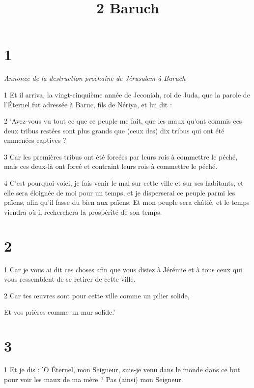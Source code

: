 

\title{2 Baruch}

\chapter{1}

\par \textit{Annonce de la destruction prochaine de Jérusalem à Baruch}

\par 1 Et il arriva, la vingt-cinquième année de Jeconiah, roi de Juda, que la parole de l'Éternel fut adressée à Baruc, fils de Nériya, et lui dit :

\par 2 'Avez-vous vu tout ce que ce peuple me fait, que les maux qu'ont commis ces deux tribus restées sont plus grands que (ceux des) dix tribus qui ont été emmenées captives ?

\par 3 Car les premières tribus ont été forcées par leurs rois à commettre le péché, mais ces deux-là ont forcé et contraint leurs rois à commettre le péché.

\par 4 C'est pourquoi voici, je fais venir le mal sur cette ville et sur ses habitants, et elle sera éloignée de moi pour un temps, et je disperserai ce peuple parmi les païens, afin qu'il fasse du bien aux païens. Et mon peuple sera châtié, et le temps viendra où il recherchera la prospérité de son temps.

\chapter{2}

\par 1 Car je vous ai dit ces choses afin que vous disiez à Jérémie et à tous ceux qui vous ressemblent de se retirer de cette ville.

\par 2 Car tes œuvres sont pour cette ville comme un pilier solide,

\par Et vos prières comme un mur solide.'

\chapter{3}

\par 1 Et je dis : 'O Éternel, mon Seigneur, suis-je venu dans le monde dans ce but pour voir les maux de ma mère ? Pas (ainsi) mon Seigneur.


